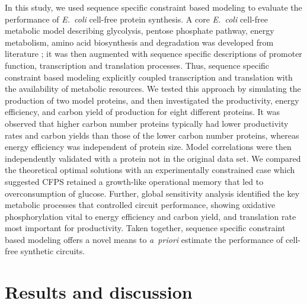 \documentclass[journal=asbcd6,manuscript=article]{achemso}
\begin{document}
In this study, we used sequence specific constraint based modeling to evaluate the performance of \emph{E.~coli} cell-free protein synthesis.
A core \emph{E.~coli} cell-free metabolic model describing glycolysis, pentose phosphate pathway, energy metabolism, amino acid biosynthesis and degradation was developed from literature \cite{Feist:2007aa}; it was then augmented with sequence specific descriptions of promoter function, transcription and translation processes.
Thus, sequence specific constraint based modeling explicitly coupled transcription and translation with the availability of metabolic resources.
We tested this approach by simulating the production of two model proteins, and then investigated the productivity, energy efficiency, and carbon yield of production for eight different proteins.
It was observed that higher carbon number proteins typically had lower productivity rates and carbon yields than those of the lower carbon number proteins, whereas energy efficiency was independent of protein size.
Model correlations were then independently validated with a protein not in the original data set.
We compared the theoretical optimal solutions with an experimentally constrained case which suggested CFPS retained a growth-like operational memory that led to overconsumption of glucose.
Further, global sensitivity analysis identified the key metabolic processes that controlled circuit performance, showing oxidative phosphorylation vital to energy efficiency and carbon yield, and translation rate most important for productivity.
Taken together, sequence specific constraint based modeling offers a novel means to \emph{a~priori} estimate the performance of cell-free synthetic circuits.

\clearpage

\section{Results and discussion}


\end{document}
